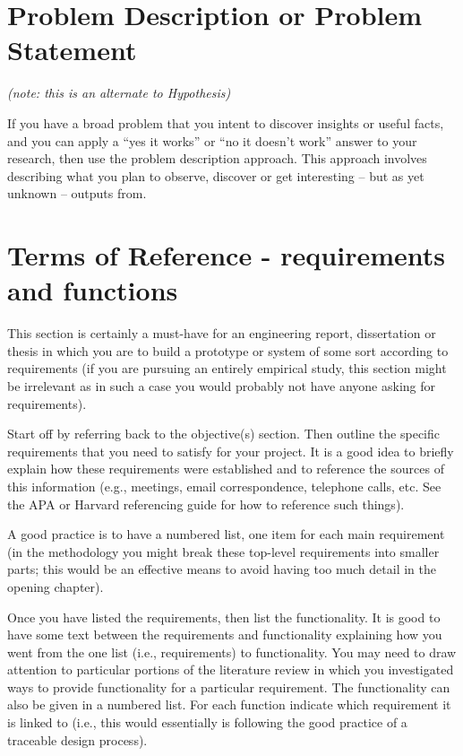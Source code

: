\section{Problem Description or Problem Statement}

\emph{(note: this is an alternate to Hypothesis)}

If you have a broad problem that you intent to discover insights or useful facts, and you can apply a ``yes it works'' or ``no it doesn't work'' answer to your research, then use the problem description approach. This approach involves describing what you plan to observe, discover or get interesting – but as yet unknown – outputs from.

\section{Terms of Reference - requirements and functions}

This section is certainly a must-have for an engineering report, dissertation or thesis in which you are to build a prototype or system of some sort according to requirements (if you are pursuing an entirely empirical study, this section might be irrelevant as in such a case you would probably not have anyone asking for requirements).

Start off by referring back to the objective(s) section. Then outline the specific requirements that you need to satisfy for your project. It is a good idea to briefly explain how these requirements were established and to reference the sources of this information (e.g., meetings, email correspondence, telephone calls, etc. See the APA or Harvard referencing guide for how to reference such things).

A good practice is to have a numbered list, one item for each main requirement (in the methodology you might break these top-level requirements into smaller parts; this would be an effective means to avoid having too much detail in the opening chapter).

Once you have listed the requirements, then list the functionality. It is good to have some text between the requirements and functionality explaining how you went from the one list (i.e., requirements) to functionality. You may need to draw attention to particular portions of the literature review in which you investigated ways to provide functionality for a particular requirement. The functionality can also be given in a numbered list. For each function indicate which requirement it is linked to (i.e., this would essentially is following the good practice of a traceable design process).

